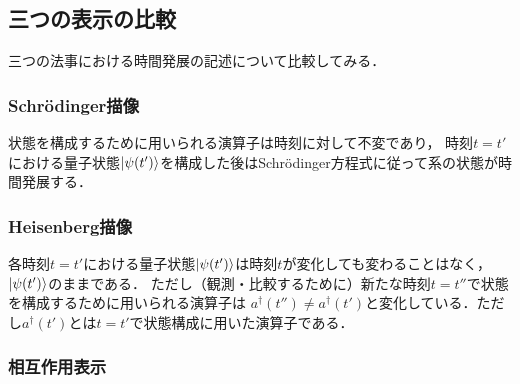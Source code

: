 \documentclass[dvipdfmx,uplatex]{jsarticle}
\numberwithin{theorem}{section}
\numberwithin{reibangou}{section}
\numberwithin{reidaibangou}{section}
\numberwithin{mondaibangou}{section}
\begin{document}
\subsection*{三つの表示の比較}
三つの法事における時間発展の記述について比較してみる．

\subsubsection*{Schr\"{o}dinger描像}
状態を構成するために用いられる演算子は時刻に対して不変であり，
時刻$t = t'$における量子状態$\ket{\psi(t')}$を構成した後はSchr\"{o}dinger方程式に従って系の状態が時間発展する．

\subsubsection*{Heisenberg描像}
各時刻$t = t'$における量子状態$\ket{\psi(t')}$は時刻$t$が変化しても変わることはなく，$\ket{\psi(t')}$のままである．
ただし（観測・比較するために）新たな時刻$t = t''$で状態を構成するために用いられる演算子は
$a^\dag(t'') \neq a^\dag(t')$と変化している．ただし$a^\dag(t')$とは$t = t'$で状態構成に用いた演算子である．

\subsubsection*{相互作用表示}
\end{document}
